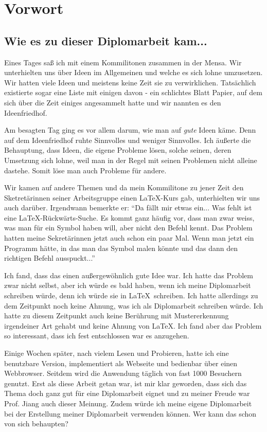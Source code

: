 \chapter{Vorwort}

\section*{Wie es zu dieser Diplomarbeit kam...}

Eines Tages saß ich mit einem Kommilitonen zusammen in der Mensa. Wir unterhielten uns über Ideen im Allgemeinen und welche es sich lohne umzusetzen. Wir hatten viele Ideen und meistens keine Zeit sie zu verwirklichen. Tatsächlich existierte sogar eine Liste mit einigen davon - ein schlichtes Blatt Papier, auf dem sich über die Zeit einiges angesammelt hatte und wir nannten es den Ideenfriedhof.

Am besagten Tag ging es vor allem darum, wie man auf {\em gute} Ideen käme. Denn auf dem Ideenfriedhof ruhte Sinnvolles und weniger Sinnvolles. Ich äußerte die Behauptung, dass Ideen, die eigene Probleme lösen, solche seinen, deren Umsetzung sich lohne, weil man in der Regel mit seinen Problemen nicht alleine dastehe. Somit löse man auch Probleme für andere.

Wir kamen auf andere Themen und da mein Kommilitone zu jener Zeit den Sketretärinnen seiner Arbeitsgruppe einen \LaTeX-Kurs gab, unterhielten wir uns auch darüber. Irgendwann bemerkte er: "`Da fällt mir etwas ein... Was fehlt ist eine \LaTeX-Rückwärts-Suche. Es kommt ganz häufig vor, dass man zwar weiss, was man für ein Symbol haben will, aber nicht den Befehl kennt. Das Problem hatten meine Sekretärinnen jetzt auch schon ein paar Mal. Wenn man jetzt ein Programm hätte, in das man das Symbol malen könnte und das dann den richtigen Befehl ausspuckt..."'

Ich fand, dass das einen außergewöhnlich gute Idee war. Ich hatte das Problem zwar nicht selbst, aber ich würde es bald haben, wenn ich meine Diplomarbeit schreiben würde, denn ich würde sie in \LaTeX\ schreiben. Ich hatte allerdings zu dem Zeitpunkt noch keine Ahnung, was ich als Diplomarbeit schreiben würde. Ich hatte zu diesem Zeitpunkt auch keine Berührung mit Mustererkennung irgendeiner Art gehabt und keine Ahnung von \LaTeX. Ich fand aber das Problem so interessant, dass ich fest entschlossen war es anzugehen.

Einige Wochen später, nach vielem Lesen und Probieren, hatte ich eine benutzbare Version, implementiert als Webseite und bedienbar über einen Webbrowser. Seitdem wird die Anwendung täglich von fast 1000 Besuchern genutzt. Erst als diese Arbeit getan war, ist mir klar geworden, dass sich das Thema doch ganz gut für eine Diplomarbeit eignet und zu meiner Freude war Prof. Jiang auch dieser Meinung. Zudem würde ich meine eigene Diplomarbeit bei der Erstellung meiner Diplomarbeit verwenden können. Wer kann das schon von sich behaupten?

